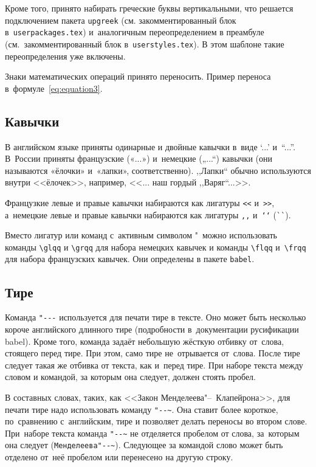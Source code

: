 Кроме того, принято набирать греческие буквы вертикальными, что
решается подключением пакета \verb|upgreek| (см. закомментированный
блок в~\verb|userpackages.tex|) и~аналогичным переопределением в
преамбуле (см.~закомментированный блок в~\verb|userstyles.tex|). В
этом шаблоне такие переопределения уже включены.

Знаки математических операций принято переносить. Пример переноса
в~формуле~\eqref{eq:equation3}.

\subsection{Кавычки}
В английском языке приняты одинарные и двойные кавычки в~виде ‘...’ и~“...”.
В~России приняты французские («...») и~немецкие („...“) кавычки (они называются
«ёлочки» и~«лапки», соответственно). ,,Лапки`` обычно используются внутри
<<ёлочек>>, например, <<... наш гордый ,,Варяг``...>>.

Французкие левые и правые кавычки набираются
как лигатуры \verb|<<| и~\verb|>>|, а~немецкие левые
и правые кавычки набираются как лигатуры \verb|,,| и~\verb|‘‘| (\verb|``|).

Вместо лигатур или команд с~активным символом "\ можно использовать команды
\verb|\glqq| и \verb|\grqq| для набора немецких кавычек и команды \verb|\flqq|
и~\verb|\frqq| для набора французских кавычек. Они определены в пакете
\verb|babel|.

\subsection{Тире}
Команда \verb|"---| используется для печати тире в тексте. Оно может быть
несколько короче английского длинного тире (подробности в~документации
русификации babel). Кроме того, команда задаёт небольшую жёсткую отбивку
от~слова, стоящего перед тире. При этом, само тире не~отрывается от~слова.
После тире следует такая же отбивка от текста, как и~перед тире. При наборе
текста между словом и командой, за которым она следует, должен стоять пробел.

В составных словах, таких, как <<Закон Менделеева"--~Клапейрона>>, для печати
тире надо использовать команду \verb|"--~|. Она ставит более короткое,
по~сравнению с~английским, тире и позволяет делать переносы во втором слове.
При~наборе текста команда \verb|"--~| не отделяется пробелом от слова,
за~которым она следует (\verb|Менделеева"--~|). Следующее за командой слово
может быть  отделено от~неё пробелом или перенесено на другую строку.

